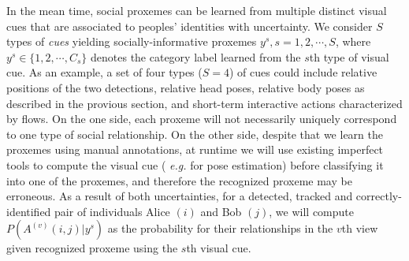 


In the mean time, social proxemes can be learned from multiple distinct visual cues that are associated to peoples' identities with uncertainty. We consider $S$ types of \emph{cues} yielding socially-informative proxemes $y^s, s=1,2,\cdots,S$, where $y^s\in\{1,2,\cdots, C_s\}$ denotes the category label learned from the $s$th type of visual cue. As an example, a set of four types ($S=4$) of cues could include relative positions of the two detections, relative head poses, relative body poses as described in the provious section, and short-term interactive actions characterized by flows. On the one side, each proxeme will not necessarily uniquely correspond to one type of social relationship. On the other side,  despite that we learn the proxemes using manual annotations, at runtime we will use existing imperfect tools to compute the visual cue ( \emph{e.g.} \cite{poselet,pose_part} for pose estimation) before classifying it into one of the proxemes, and therefore the recognized proxeme may be erroneous. As a result of both uncertainties, for a detected, tracked and correctly-identified pair of individuals Alice $(i)$ and Bob $(j)$, we will compute $P(A^{(v)}(i,j)|y^s)$ as the probability for their relationships in the $v$th view given recognized proxeme using the $s$th visual cue.

